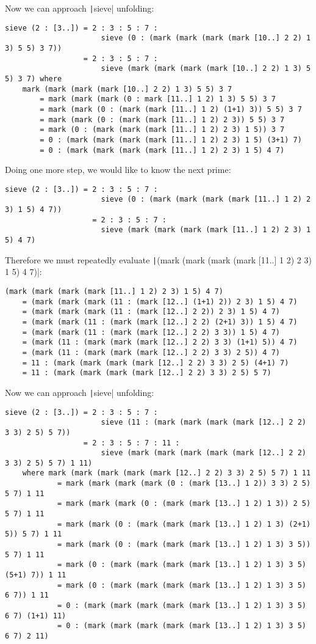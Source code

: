 Now we can approach \texttt|sieve| unfolding:
\begin{verbatim}
sieve (2 : [3..]) = 2 : 3 : 5 : 7 : 
                      sieve (0 : (mark (mark (mark (mark [10..] 2 2) 1 3) 5 5) 3 7)) 
                  = 2 : 3 : 5 : 7 : 
                      sieve (mark (mark (mark (mark [10..] 2 2) 1 3) 5 5) 3 7) where
    mark (mark (mark (mark [10..] 2 2) 1 3) 5 5) 3 7
        = mark (mark (mark (0 : mark [11..] 1 2) 1 3) 5 5) 3 7
        = mark (mark (0 : (mark (mark [11..] 1 2) (1+1) 3)) 5 5) 3 7
        = mark (mark (0 : (mark (mark [11..] 1 2) 2 3)) 5 5) 3 7
        = mark (0 : (mark (mark (mark [11..] 1 2) 2 3) 1 5)) 3 7
        = 0 : (mark (mark (mark (mark [11..] 1 2) 2 3) 1 5) (3+1) 7)
        = 0 : (mark (mark (mark (mark [11..] 1 2) 2 3) 1 5) 4 7)
\end{verbatim}
Doing one more step, we would like to know the next prime:
\begin{verbatim}
sieve (2 : [3..]) = 2 : 3 : 5 : 7 : 
                      sieve (0 : (mark (mark (mark (mark [11..] 1 2) 2 3) 1 5) 4 7))
                    = 2 : 3 : 5 : 7 : 
                      sieve (mark (mark (mark (mark [11..] 1 2) 2 3) 1 5) 4 7)
\end{verbatim}
Therefore we must repeatedly evaluate \texttt|(mark (mark (mark (mark [11..] 1 2) 2 3) 1 5) 4 7)|:
\begin{verbatim}
(mark (mark (mark (mark [11..] 1 2) 2 3) 1 5) 4 7)
    = (mark (mark (mark (11 : (mark [12..] (1+1) 2)) 2 3) 1 5) 4 7)
    = (mark (mark (mark (11 : (mark [12..] 2 2)) 2 3) 1 5) 4 7)
    = (mark (mark (11 : (mark (mark [12..] 2 2) (2+1) 3)) 1 5) 4 7)
    = (mark (mark (11 : (mark (mark [12..] 2 2) 3 3)) 1 5) 4 7)
    = (mark (11 : (mark (mark (mark [12..] 2 2) 3 3) (1+1) 5)) 4 7)
    = (mark (11 : (mark (mark (mark [12..] 2 2) 3 3) 2 5)) 4 7)
    = 11 : (mark (mark (mark (mark [12..] 2 2) 3 3) 2 5) (4+1) 7)
    = 11 : (mark (mark (mark (mark [12..] 2 2) 3 3) 2 5) 5 7)
\end{verbatim}
Now we can approach \texttt|sieve| unfolding:
\begin{verbatim}
sieve (2 : [3..]) = 2 : 3 : 5 : 7 : 
                      sieve (11 : (mark (mark (mark (mark [12..] 2 2) 3 3) 2 5) 5 7))
                  = 2 : 3 : 5 : 7 : 11 :
                      sieve (mark (mark (mark (mark (mark [12..] 2 2) 3 3) 2 5) 5 7) 1 11)
    where mark (mark (mark (mark (mark [12..] 2 2) 3 3) 2 5) 5 7) 1 11
            = mark (mark (mark (mark (0 : (mark [13..] 1 2)) 3 3) 2 5) 5 7) 1 11
            = mark (mark (mark (0 : (mark (mark [13..] 1 2) 1 3)) 2 5) 5 7) 1 11
            = mark (mark (0 : (mark (mark (mark [13..] 1 2) 1 3) (2+1) 5)) 5 7) 1 11
            = mark (mark (0 : (mark (mark (mark [13..] 1 2) 1 3) 3 5)) 5 7) 1 11
            = mark (0 : (mark (mark (mark (mark [13..] 1 2) 1 3) 3 5) (5+1) 7)) 1 11
            = mark (0 : (mark (mark (mark (mark [13..] 1 2) 1 3) 3 5) 6 7)) 1 11
            = 0 : (mark (mark (mark (mark (mark [13..] 1 2) 1 3) 3 5) 6 7) (1+1) 11)
            = 0 : (mark (mark (mark (mark (mark [13..] 1 2) 1 3) 3 5) 6 7) 2 11)
\end{verbatim}
